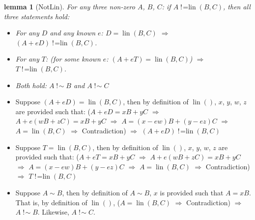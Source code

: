 \documentclass{mathcryptology} %
\DeclareMathOperator{\notsim}{!\!\sim}
\DeclareMathOperator{\lin}{lin}
\DeclareMathOperator{\notlin}{!\!=lin}
\theoremstyle{title}
\newtheorem*{titlelemma}{lemma}
\theoremstyle{titleof}
\renewenvironment{proof}{\noindent{\bfseries Proof:} }{}
\begin{document}
    \begin{titlelemma}[NotLin]
        For any three non-zero $A$, $B$, $C$: if $A\notlin\left(B, C\right)$, then all three statements hold:
        \begin{itemize}
            \item[a)] For any $D$ and any known $e$: $D=\lin\left(B, C\right)$ $\Rightarrow$ $\left(A+eD\right)\notlin\left(B, C\right)$.
            \item[b)] For any $T$: (for some known $e$: $\left(A+eT\right)=\lin\left(B, C\right)$) $\Rightarrow$ $T\notlin\left(B, C\right)$.
            \item[c)] Both hold: $A\notsim B$ and $A\notsim C$
        \end{itemize}
    \end{titlelemma}
    \begin{proof}
        \begin{itemize}
            \item[a)] Suppose $\left(A+eD\right)=\lin\left(B, C\right)$, then by definition of $\lin()$, $x$, $y$, $w$, $z$ are provided such that: ($A+eD=xB+yC$ $\Rightarrow$ $A+e\left(wB+zC\right)=xB+yC$ $\Rightarrow$ $A=\left(x-ew\right)B+\left(y-ez\right)C$ $\Rightarrow$ $A=\lin\left(B, C\right)$ $\Rightarrow$ Contradiction) $\Rightarrow$ $\left(A+eD\right)\notlin\left(B, C\right)$
            \item[b)] Suppose $T=\lin\left(B, C\right)$, then by definition of $\lin()$, $x$, $y$, $w$, $z$ are provided such that: ($A+eT=xB+yC$ $\Rightarrow$ $A+e\left(wB+zC\right)=xB+yC$ $\Rightarrow$ $A=\left(x-ew\right)B+\left(y-ez\right)C$ $\Rightarrow$ $A=\lin\left(B, C\right)$ $\Rightarrow$ Contradiction) $\Rightarrow$ $T\notlin\left(B, C\right)$
            \item[c)] Suppose $A\sim B$, then by definition of $A\sim B$, $x$ is provided such that $A=xB$. That is, by definition of $\lin()$, ($A=\lin\left(B, C\right)$ $\Rightarrow$ Contradiction) $\Rightarrow$ $A\notsim B$. Likewise, $A\notsim C$.
        \end{itemize}
    \end{proof}
\end{document}

